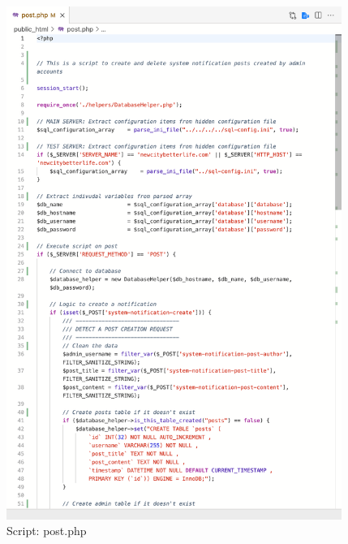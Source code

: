 \documentclass[12pt, letterpaper]{article}
\begin{document}
\begin{figure}[htbp]
	\centering
	\includegraphics[width=4.3in]{images/22-script-3.png}
	\caption{Script: post.php}
 \end{figure}

\end{document}
